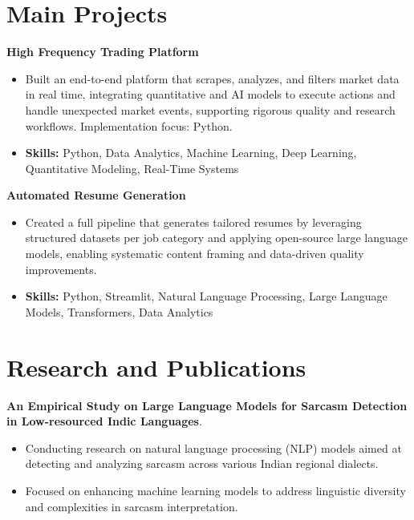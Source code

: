 \documentclass[a4paper,11pt]{article}
\begin{document}
\section{\textbf{Main Projects}}

\vspace{1mm}
  \textbf{High Frequency Trading Platform  }
\vspace{-1.5mm} %
\begin{itemize}
  \item Built an end-to-end platform that scrapes, analyzes, and filters market data in real time, integrating quantitative and AI models to execute actions and handle unexpected market events, supporting rigorous quality and research workflows. Implementation focus: Python.
\vspace{-3mm}
  \item \textbf{Skills:} Python, Data Analytics, Machine Learning, Deep Learning, Quantitative Modeling, Real-Time Systems
\end{itemize}


\vspace{1mm}
   \textbf{Automated Resume Generation }
\vspace{-1.5mm} %
\begin{itemize}
  \item Created a full pipeline that generates tailored resumes by leveraging structured datasets per job category and applying open-source large language models, enabling systematic content framing and data-driven quality improvements.
\vspace{-3mm}
  \item \textbf{Skills:} Python, Streamlit, Natural Language Processing, Large Language Models, Transformers, Data Analytics
\end{itemize}



\section{\textbf{Research and Publications} \hfill }
\vspace{1mm}
  \textbf{An Empirical Study on Large Language Models for Sarcasm Detection in Low-resourced Indic Languages}.
\vspace{-1mm} %
\begin{itemize}
  \item Conducting research on natural language processing (NLP) models aimed at detecting and analyzing sarcasm across various Indian regional dialects.
\vspace{-3mm}
  \item Focused on enhancing machine learning models to address linguistic diversity and complexities in sarcasm interpretation.
\end{itemize}
\end{document}
